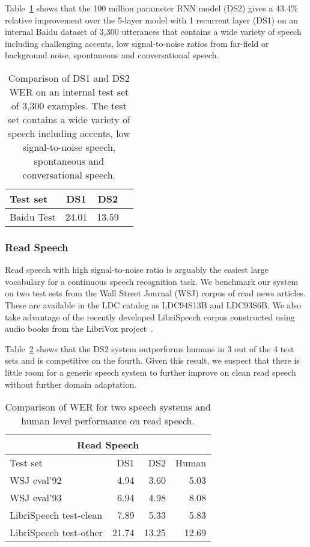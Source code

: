 Table~\ref{table:scaling_asr:test} shows that the 100 million parameter RNN
model (DS2) gives a 43.4\% relative improvement over the 5-layer model with 1
recurrent layer (DS1) on an internal Baidu dataset of 3,300 utterances that
contains a wide variety of speech including challenging accents, low
signal-to-noise ratios from far-field or background noise, spontaneous and
conversational speech. 

\begin{table}
\centering
\begin{tabular}{l  c  c  c}
\toprule
Test set   & DS1 & DS2 \\
\midrule
Baidu Test & 24.01  & 13.59 \\
\bottomrule
\end{tabular}
\caption{Comparison of DS1 and DS2 WER on an internal test set of 3,300
    examples. The test set contains a wide variety of speech including accents,
    low signal-to-noise speech, spontaneous and conversational speech.}
\label{table:scaling_asr:test}
\end{table}

\subsubsection{Read Speech}

Read speech with high signal-to-noise ratio is arguably the easiest large
vocabulary for a continuous speech recognition task. We benchmark our system on
two test sets from the Wall Street Journal (WSJ) corpus of read news articles.
These are available in the LDC catalog as LDC94S13B and LDC93S6B. We also take
advantage of the recently developed LibriSpeech corpus constructed using audio
books from the LibriVox project~\cite{panayotov2015}.

Table~\ref{table:scaling_asr:readspeech} shows that the DS2 system outperforms
humans in 3 out of the 4 test sets and is competitive on the fourth. Given this
result, we suspect that there is little room for a generic speech system to
further improve on clean read speech without further domain adaptation.

\begin{table}
\centering
\begin{tabular}{l  r  r r}
\toprule
\multicolumn{4}{c}{Read Speech}\\
\midrule
Test set               & DS1   & DS2 &  Human \\ 
\midrule
WSJ eval'92            & 4.94  & 3.60  & 5.03 \\ 
WSJ eval'93            & 6.94  & 4.98  & 8.08 \\ 
LibriSpeech test-clean & 7.89  & 5.33  & 5.83 \\ 
LibriSpeech test-other & 21.74 & 13.25 & 12.69 \\ 
\bottomrule
\end{tabular}
\caption{Comparison of WER for two speech systems and human level performance
         on read speech.}
\label{table:scaling_asr:readspeech}
\end{table}

